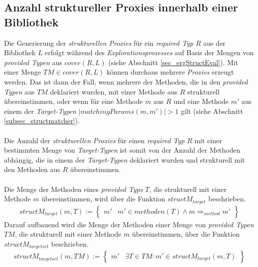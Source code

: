 \subsection{Anzahl struktureller Proxies innerhalb einer Bibliothek}\label{sec_anzahlProxies}
Die Generierung der \emph{strukturellen Proxies} für ein \emph{required Typ} $R$ aus der Bibliothek $L$ erfolgt während des \emph{Explorationsprozesses} auf Basis der Mengen von \emph{provided Typen} aus $\mathit{cover(R,L)}$ (siehe Abschnitt \ref{sec_ergStructEval}). Mit einer Menge $\mathit{TM} \in \mathit{cover(R,L)}$ können durchaus mehrere \emph{Proxies} erzeugt werden. Das ist dann der Fall, wenn mehrere der Methoden, die in den \emph{provided Typen} aus $\mathit{TM}$ deklariert wurden, mit einer Methode aus $R$ strukturell übereinstimmen, oder wenn für eine Methode $m$ aus $R$ und eine Methode $m'$ aus einem der \emph{Target-Typen} $|matchingParams(m,m')| > 1$ gilt (siehe Abschnitt \ref{subsec_structmatcher}).
\\\\
Die Anzahl der \emph{strukturellen Proxies} für einen \emph{required Typ} $R$ mit einer bestimmten Menge von \emph{Target-Typen} ist somit von der Anzahl der Methoden abhängig, die in einem der \emph{Target-Typen} deklariert wurden und strukturell mit den Methoden aus $R$ übereinstimmen. 
\\\\
Die Menge der Methoden eines \emph{provided Typs} $T$, die strukturell mit einer Methode $m$ übereinstimmen, wird über die Funktion $\mathit{structM_{target}}$ beschrieben.
\begin{gather*}
\mathit{structM_{target}(m, T)} := 
\left\{\begin{array}{l|l}
m'	& m' \in \mathit{methoden(T)} \wedge  m \Rightarrow_{method} m'
\end{array}
\right\}
\end{gather*}
\noindent
Darauf aufbauend wird die Menge der Methoden einer Menge von \emph{provided Typen} $\mathit{TM}$, die strukturell mit einer Methode $m$ übereinstimmen, über die Funktion $\mathit{structM_{targetset}}$ beschrieben.
\begin{gather*}
\mathit{structM_{targetset}(m, \mathit{TM})} := 
\left\{\begin{array}{l|l}
m'	& \exists T \in \mathit{TM}: m' \in \mathit{structM_{target}(m,T)}
\end{array}
\right\}
\end{gather*}
\noindent

